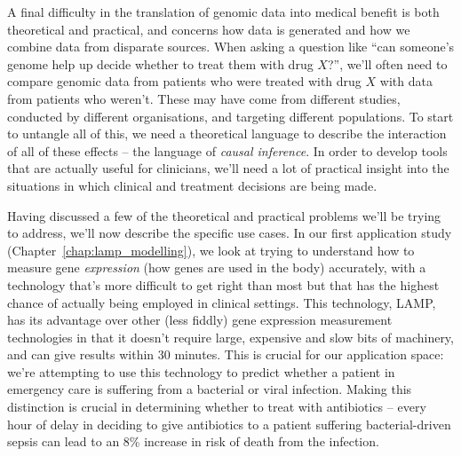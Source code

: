 \documentclass[../thesis.tex]{subfiles}
\begin{document}
A final difficulty in the translation of genomic data into medical benefit is both theoretical and practical, and concerns how data is generated and how we combine data from disparate sources. When asking a question like ``can someone's genome help up decide whether to treat them with drug $X$?'', we'll often need to compare genomic data from patients who were treated with drug $X$ with data from patients who weren't. These may have come from different studies, conducted by different organisations, and targeting different populations. To start to untangle all of this, we need a theoretical language to describe the interaction of all of these effects -- the language of \emph{causal inference}. In order to develop tools that are actually useful for clinicians, we'll need a lot of practical insight into the situations in which clinical and treatment decisions are being made.

Having discussed a few of the theoretical and practical problems we'll be trying to address, we'll now describe the specific use cases. In our first application study (Chapter~\ref{chap:lamp_modelling}), we look at trying to understand how to measure gene \emph{expression} (how genes are used in the body) accurately, with a technology that's more difficult to get right than most but that has the highest chance of actually being employed in clinical settings. This technology, LAMP, has its advantage over other (less fiddly) gene expression measurement technologies in that it doesn't require large, expensive and slow bits of machinery, and can give results within 30 minutes. This is crucial for our application space: we're attempting to use this technology to predict whether a patient in emergency care is suffering from a bacterial or viral infection. Making this distinction is crucial in determining whether to treat with antibiotics -- every hour of delay in deciding to give antibiotics to a patient suffering bacterial-driven sepsis can lead to an 8\% increase in risk of death from the infection.
\end{document}
